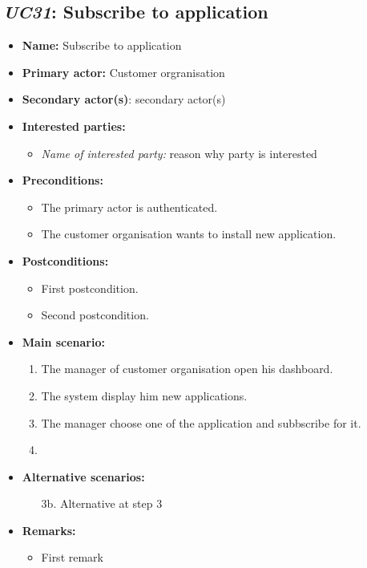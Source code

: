 \subsection{\emph{UC31}: Subscribe to application}
\begin{itemize}
    \item \textbf{Name:} Subscribe to application
    \item \textbf{Primary actor:} Customer orgranisation
    \item \textbf{Secondary actor(s)}: secondary actor(s)
    \item \textbf{Interested parties:}
        \begin{itemize}
            \item \textit{Name of interested party:} reason why party is interested
        \end{itemize}

    \item \textbf{Preconditions:}
        \begin{itemize}
            \item The primary actor is authenticated.
            \item The customer organisation wants to install new application.
        \end{itemize}

    \item \textbf{Postconditions:}
        \begin{itemize}
            \item First postcondition.
            \item Second postcondition.
        \end{itemize}

    \item \textbf{Main scenario:}
    \begin{enumerate}
       \item The manager of customer organisation open his dashboard.
       \item The system display him new applications.
       \item The manager choose one of the application and subbscribe for it.
       \item
    \end{enumerate}

    \item \textbf{Alternative scenarios:}
    \begin{enumerate}
        \item [3b.] Alternative at step 3
    \end{enumerate}

    \item \textbf{Remarks:}
        \begin{itemize}
            \item First remark
        \end{itemize}
\end{itemize}

